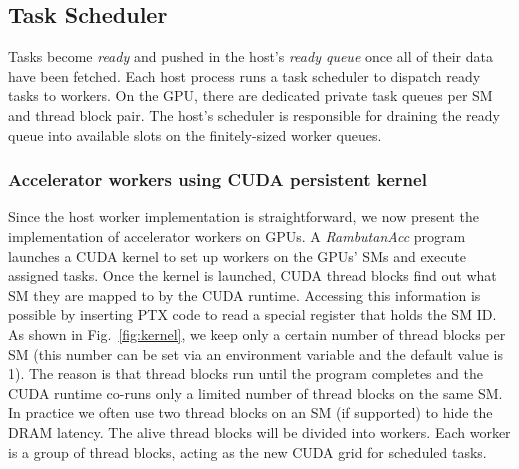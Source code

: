 \subsection{Task Scheduler}
Tasks become {\em ready} and pushed in the host's {\em ready queue} once all of their data have been fetched.
Each host process runs a task scheduler to dispatch ready tasks to workers. On the GPU, there are
dedicated private task queues per SM and thread block pair. The host's scheduler is responsible
for draining the ready queue into available slots on the finitely-sized worker queues.


\subsubsection{Accelerator workers using CUDA persistent kernel}
Since the host worker implementation is straightforward, we now present the implementation of accelerator workers on GPUs.
A {\em RambutanAcc} program launches a CUDA kernel to set up workers on the GPUs' SMs and execute assigned tasks.
Once the kernel is launched, CUDA thread blocks find out what SM they are mapped to by the CUDA runtime.
Accessing this information is possible by inserting PTX code to read a special register that holds the SM ID.
As shown in Fig.~\ref{fig:kernel}, we keep only a certain number of thread blocks per SM (this number can be set via an environment variable and the default value is 1).
The reason is that thread blocks run until the program completes and the CUDA runtime co-runs only a limited number of thread blocks on the same SM.
In practice we often use two thread blocks on an SM (if supported) to hide the DRAM latency.
The alive thread blocks will be divided into workers.
Each worker is a group of thread blocks, acting as the new CUDA grid for scheduled tasks.

